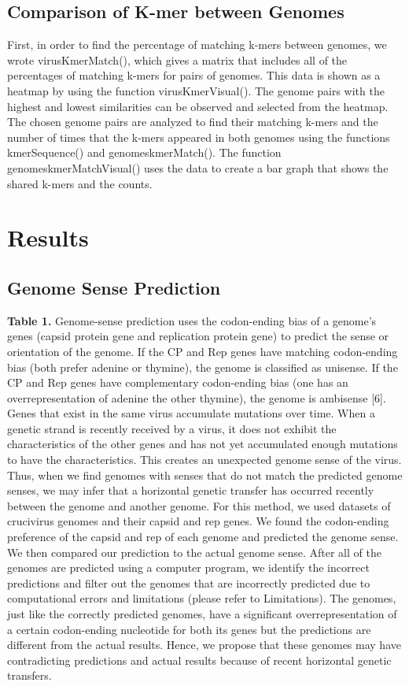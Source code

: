 \documentclass[eng]{ajceam-class}
\begin{document}
\subsection{Comparison of K-mer between Genomes}

First, in order to find the percentage of matching k-mers between genomes, we wrote virusKmerMatch(), which gives a matrix that includes all of the percentages of matching k-mers for pairs of genomes. This data is shown as a heatmap by using the function virusKmerVisual(). The genome pairs with the highest and lowest similarities can be observed and selected from the heatmap. The chosen genome pairs are analyzed to find their matching k-mers and the number of times that the k-mers appeared in both genomes using the functions kmerSequence() and genomeskmerMatch(). The function genomeskmerMatchVisual() uses the data to create a bar graph that shows the shared k-mers and the counts.

\section{Results}

\subsection{Genome Sense Prediction}

\textbf{Table 1.} Genome-sense prediction uses the codon-ending bias of a genome’s genes (capsid protein gene and replication protein gene) to predict the sense or orientation of the genome. If the CP and Rep genes have matching codon-ending bias (both prefer adenine or thymine), the genome is classified as unisense. If the CP and Rep genes have complementary codon-ending bias (one has an overrepresentation of adenine the other thymine), the genome is ambisense [6]. Genes that exist in the same virus accumulate mutations over time. When a genetic strand is recently received by a virus, it does not exhibit the characteristics of the other genes and has not yet accumulated enough mutations to have the characteristics. This creates an unexpected genome sense of the virus. Thus, when we find genomes with senses that do not match the predicted genome senses, we may infer that a horizontal genetic transfer has occurred recently between the genome and another genome. For this method, we used datasets of crucivirus genomes and their capsid and rep genes. We found the codon-ending preference of the capsid and rep of each genome and predicted the genome sense. We then compared our prediction to the actual genome sense. After all of the genomes are predicted using a computer program, we identify the incorrect predictions and filter out the genomes that are incorrectly predicted due to computational errors and limitations (please refer to Limitations). The genomes, just like the correctly predicted genomes, have a significant overrepresentation of a certain codon-ending nucleotide for both its genes but the predictions are different from the actual results. Hence, we propose that these genomes may have contradicting predictions and actual results because of recent horizontal genetic transfers.
\end{document}
